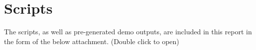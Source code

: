 \documentclass{report}
\begin{document}
		\section{Scripts}
			The scripts, as well as pre-generated demo outputs, are included in this report in the form of the below attachment. (Double click to open)\\[\baselineskip]
	
\end{document}

